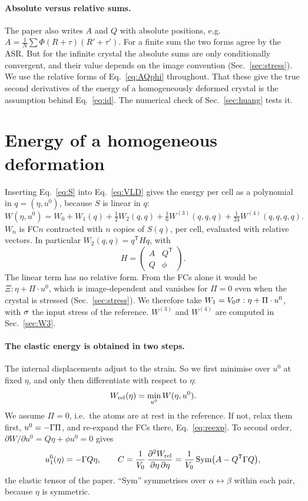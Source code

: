 \documentclass[11pt,a4paper]{article}
\newcommand{\al}{\alpha}\newcommand{\be}{\beta}\newcommand{\ga}{\gamma}\newcommand{\de}{\delta}
\newcommand{\Wt}{W^{(3)}}\newcommand{\Wf}{W^{(4)}}
\begin{document}
\paragraph{Absolute versus relative sums.} The paper also writes $A$ and $Q$ with absolute positions,
e.g.\ $A=\frac1N\sum\Phi(R+\tau)(R'+\tau')$. For a finite sum the two forms agree by the ASR. But for
the infinite crystal the absolute sums are only conditionally convergent, and their value depends on
the image convention (Sec.~\ref{sec:stress}). We use the relative forms of Eq.~\eqref{eq:AQphi} throughout.
That these give the true second derivatives of the energy of a homogeneously deformed crystal is the
assumption behind Eq.~\eqref{eq:id}. The numerical check of Sec.~\ref{sec:huang} tests it.

\section{Energy of a homogeneous deformation}
Inserting Eq.~\eqref{eq:S} into Eq.~\eqref{eq:VLD} gives the energy per cell as a polynomial in
$q=(\eta,u^0)$, because $S$ is linear in $q$:
\begin{equation}
W(\eta,u^0)=W_0+W_1(q)+\tfrac12W_2(q,q)+\tfrac16\Wt(q,q,q)+\tfrac1{24}\Wf(q,q,q,q).
\label{eq:W}
\end{equation}
$W_n$ is FC$n$ contracted with $n$ copies of $S(q)$, per cell, evaluated with relative vectors. In
particular $W_2(q,q)=q^{\mathsf T}Hq$, with
\begin{equation}
H=\begin{pmatrix}A&Q^{\mathsf T}\\ Q&\phi\end{pmatrix}.
\end{equation}
The linear term has no relative form. From the FCs alone it would be $\Xi:\eta+\Pi\cdot u^0$, which is
image-dependent and vanishes for $\Pi=0$ even when the crystal is stressed (Sec.~\ref{sec:stress}). We
therefore take $W_1=V_0\sigma:\eta+\Pi\cdot u^0$, with $\sigma$ the input stress of the reference. $\Wt$ and $\Wf$
are computed in Sec.~\ref{sec:W3}.

\paragraph{The elastic energy is obtained in two steps.} The internal displacements adjust to the strain.
So we first minimise over $u^0$ at fixed $\eta$, and only then differentiate with respect to $\eta$:
\begin{equation}
W_{\rm rel}(\eta)=\min_{u^0}W(\eta,u^0).
\label{eq:Wrel}
\end{equation}
We assume $\Pi=0$, i.e.\ the atoms are at rest in the reference. If not, relax them first, $u^0=-\Gamma\Pi$,
and re-expand the FCs there, Eq.~\eqref{eq:reexp}. To second order, $\partial W/\partial u^0=Q\eta+\phi u^0=0$ gives
\begin{equation}
u^0_1(\eta)=-\Gamma Q\eta ,\qquad
C=\frac1{V_0}\,\frac{\partial^2W_{\rm rel}}{\partial\eta\,\partial\eta}=\frac1{V_0}\,\mathrm{Sym}\big(A-Q^{\mathsf T}\Gamma Q\big),
\label{eq:C}
\end{equation}
the elastic tensor of the paper. ``Sym'' symmetrises over $\al\leftrightarrow\be$ within each pair,
because $\eta$ is symmetric.
\end{document}
